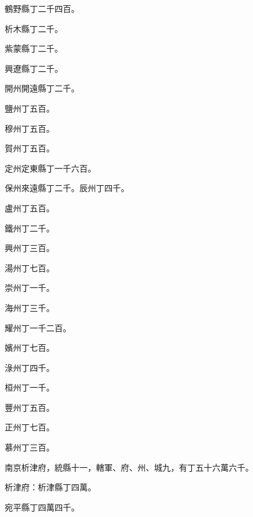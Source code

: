 \begin{pinyinscope}
 鶴野縣丁二千四百。



 析木縣丁二千。



 紫蒙縣丁二千。



 興遼縣丁二千。



 開州開遠縣丁二千。



 鹽州丁五百。



 穆州丁五百。



 賀州丁五百。



 定州定東縣丁一千六百。



 保州來遠縣丁二千。辰州丁四千。



 盧州丁五百。



 鐵州丁二千。



 興州丁三百。



 湯州丁七百。



 崇州丁一千。



 海州丁三千。



 耀州丁一千二百。



 嬪州丁七百。



 淥州丁四千。



 桓州丁一千。



 豐州丁五百。



 正州丁七百。



 慕州丁三百。



 南京析津府，統縣十一，轄軍、府、州、城九，有丁五十六萬六千。



 析津府：析津縣丁四萬。



 宛平縣丁四萬四千。




\end{pinyinscope}
